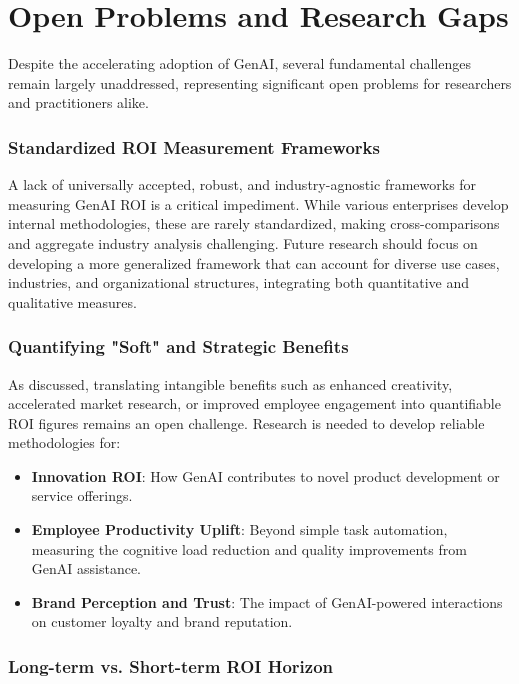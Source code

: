 \documentclass{article}
\begin{document}
\section{Open Problems and Research Gaps}


Despite the accelerating adoption of GenAI, several fundamental challenges remain largely unaddressed, representing significant open problems for researchers and practitioners alike.


\subsubsection{Standardized ROI Measurement Frameworks}

A lack of universally accepted, robust, and industry-agnostic frameworks for measuring GenAI ROI is a critical impediment. While various enterprises develop internal methodologies, these are rarely standardized, making cross-comparisons and aggregate industry analysis challenging. Future research should focus on developing a more generalized framework that can account for diverse use cases, industries, and organizational structures, integrating both quantitative and qualitative measures.


\subsubsection{Quantifying "Soft" and Strategic Benefits}

As discussed, translating intangible benefits such as enhanced creativity, accelerated market research, or improved employee engagement into quantifiable ROI figures remains an open challenge. Research is needed to develop reliable methodologies for:
\begin{itemize}
  \item \textbf{Innovation ROI}: How GenAI contributes to novel product development or service offerings.
  \item \textbf{Employee Productivity Uplift}: Beyond simple task automation, measuring the cognitive load reduction and quality improvements from GenAI assistance.
  \item \textbf{Brand Perception and Trust}: The impact of GenAI-powered interactions on customer loyalty and brand reputation.
\end{itemize}


\subsubsection{Long-term vs. Short-term ROI Horizon}
\end{document}
